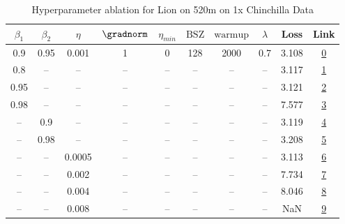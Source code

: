 \begin{table}[H]
\centering
\caption{Hyperparameter ablation for Lion on 520m on 1x Chinchilla Data}
\label{tab:ablation_lion_520m_on_1x_chinchilla_data}
\begin{tabular}{cccccccccc}
\toprule
$\beta_1$ & $\beta_2$ & $\eta$ & $\gradnorm$ & $\eta_{min}$ & $\mathrm{BSZ}$ & $\mathrm{warmup}$ & $\lambda$ & Loss & Link \\
\midrule
0.9 & 0.95 & 0.001 & 1 & 0 & 128 & 2000 & 0.7 & 3.108 & \href{https://wandb.ai/stanford-mercury/optimizer-scaling/runs/sweep-520m-10B-liond8061alr0.001-wd0.7-minlr0-warmup2000-b10.9-b-942db7}{0} \\
\midrule
0.8 & -- & -- & -- & -- & -- & -- & -- & 3.117 & \href{https://wandb.ai/stanford-mercury/optimizer-scaling/runs/sweep-520m-10B-lion6ebc4dlr0.001-wd0.7-minlr0-warmup2000-b10.8-b-edd66c}{1} \\
0.95 & -- & -- & -- & -- & -- & -- & -- & 3.121 & \href{https://wandb.ai/stanford-mercury/optimizer-scaling/runs/sweep-520m-10B-lion6ee825lr0.001-wd0.7-minlr0-warmup2000-b10.95--60d07d}{2} \\
0.98 & -- & -- & -- & -- & -- & -- & -- & 7.577 & \href{https://wandb.ai/stanford-mercury/optimizer-scaling/runs/sweep-520m-10B-lion98635alr0.001-wd0.7-minlr0-warmup2000-b10.98--391c82}{3} \\
-- & 0.9 & -- & -- & -- & -- & -- & -- & 3.119 & \href{https://wandb.ai/stanford-mercury/optimizer-scaling/runs/sweep-520m-10B-lioncda5edlr0.001-wd0.7-minlr0-warmup2000-b10.9-b-2427cd}{4} \\
-- & 0.98 & -- & -- & -- & -- & -- & -- & 3.208 & \href{https://wandb.ai/stanford-mercury/optimizer-scaling/runs/sweep-520m-10B-lion489f64lr0.001-wd0.7-minlr0-warmup2000-b10.9-b-5ffcf2}{5} \\
-- & -- & 0.0005 & -- & -- & -- & -- & -- & 3.113 & \href{https://wandb.ai/stanford-mercury/optimizer-scaling/runs/sweep-520m-10B-lionfc33e8lr0.0005-wd0.7-minlr0-warmup2000-b10.9--6dcec6}{6} \\
-- & -- & 0.002 & -- & -- & -- & -- & -- & 7.734 & \href{https://wandb.ai/stanford-mercury/optimizer-scaling/runs/sweep-520m-10B-lion2ece3elr0.002-wd0.7-minlr0-warmup2000-b10.9-b-cce61a}{7} \\
-- & -- & 0.004 & -- & -- & -- & -- & -- & 8.046 & \href{https://wandb.ai/stanford-mercury/optimizer-scaling/runs/sweep-520m-10B-liony13cd19lr0.004-wd0.7-minlr0-warmup2000-b10.9--902a44}{8} \\
-- & -- & 0.008 & -- & -- & -- & -- & -- & NaN & \href{https://wandb.ai/stanford-mercury/optimizer-scaling/runs/sweep-520m-10B-lionbfc5e9lr0.008-wd0.7-minlr0-warmup2000-b10.9-b-2bcac3}{9} \\

\end{tabular}
\end{table}

